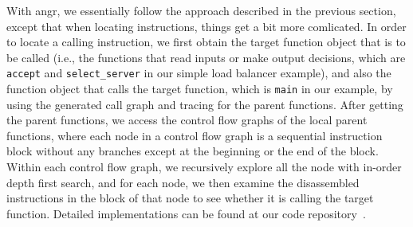 With angr, we essentially follow the approach described in the previous section,
except that when locating instructions, things get a bit more comlicated. In
order to locate a calling instruction, we first obtain the target function
object that is to be called (i.e., the functions that read inputs or make output
decisions, which are \texttt{accept} and \texttt{select\_server} in our simple
load balancer example), and also the function object that calls the target
function, which is \texttt{main} in our example, by using the generated call
graph and tracing for the parent functions. After getting the parent functions,
we access the control flow graphs of the local parent functions, where each node
in a control flow graph is a sequential instruction block without any branches
except at the beginning or the end of the block. Within each control flow graph,
we recursively explore all the node with in-order depth first search, and for
each node, we then examine the disassembled instructions in the block of that
node to see whether it is calling the target function. Detailed implementations
can be found at our code repository~\cite{nekton-repo}.


